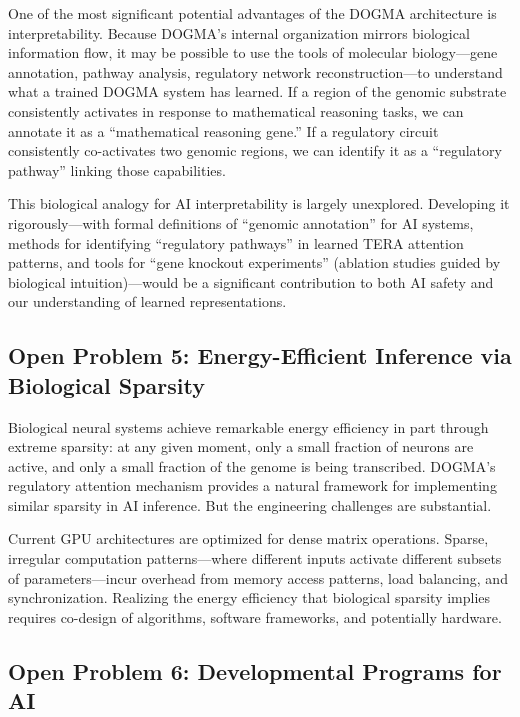 One of the most significant potential advantages of the DOGMA architecture is interpretability. Because DOGMA's internal organization mirrors biological information flow, it may be possible to use the tools of molecular biology---gene annotation, pathway analysis, regulatory network reconstruction---to understand what a trained DOGMA system has learned. If a region of the genomic substrate consistently activates in response to mathematical reasoning tasks, we can annotate it as a ``mathematical reasoning gene.'' If a regulatory circuit consistently co-activates two genomic regions, we can identify it as a ``regulatory pathway'' linking those capabilities.

This biological analogy for AI interpretability is largely unexplored. Developing it rigorously---with formal definitions of ``genomic annotation'' for AI systems, methods for identifying ``regulatory pathways'' in learned TERA attention patterns, and tools for ``gene knockout experiments'' (ablation studies guided by biological intuition)---would be a significant contribution to both AI safety and our understanding of learned representations.

\subsection{Open Problem 5: Energy-Efficient Inference via Biological Sparsity}

Biological neural systems achieve remarkable energy efficiency in part through extreme sparsity: at any given moment, only a small fraction of neurons are active, and only a small fraction of the genome is being transcribed. DOGMA's regulatory attention mechanism provides a natural framework for implementing similar sparsity in AI inference. But the engineering challenges are substantial.

Current GPU architectures are optimized for dense matrix operations. Sparse, irregular computation patterns---where different inputs activate different subsets of parameters---incur overhead from memory access patterns, load balancing, and synchronization. Realizing the energy efficiency that biological sparsity implies requires co-design of algorithms, software frameworks, and potentially hardware.

\subsection{Open Problem 6: Developmental Programs for AI}

